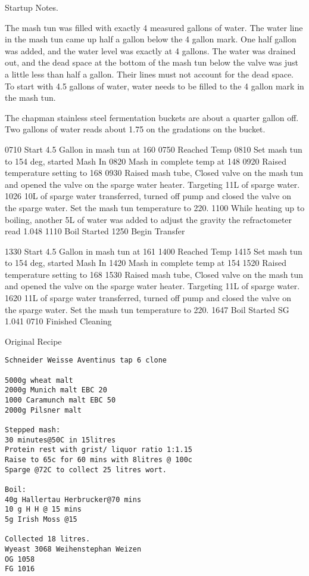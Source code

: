 Startup Notes.
\begin{my_itemize}
  \item The mash tun was filled with exactly 4 measured gallons of water.  The water line in the mash tun came up half a gallon below the 4 gallon mark.  One half gallon was added, and the water level was exactly at 4 gallons.  The water was drained out, and the dead space at the bottom of the mash tun below the valve was just a little less than half a gallon.  Their lines must not account for the dead space.  To start with 4.5 gallons of water, water needs to be filled to the 4 gallon mark in the mash tun.
  \item The chapman stainless steel fermentation buckets are about a quarter gallon off.  Two gallons of water reads about 1.75 on the gradations on the bucket.
\end{my_itemize}
0710 Start 4.5 Gallon in mash tun at 160
0750 Reached Temp
0810 Set mash tun to 154 deg, started Mash In
0820 Mash in complete temp at 148
0920 Raised temperature setting to 168
0930 Raised mash tube, Closed valve on the mash tun and opened the valve on the sparge water heater.  Targeting 11L of sparge water.
1026 10L of sparge water transferred, turned off pump and closed the valve on the sparge water.  Set the mash tun temperature to 220.
1100 While heating up to boiling, another 5L of water was added to adjust the gravity the refractometer read 1.048 
1110 Boil Started
1250 Begin Transfer

1330 Start 4.5 Gallon in mash tun at 161
1400 Reached Temp
1415 Set mash tun to 154 deg, started Mash In
1420 Mash in complete temp at 154
1520 Raised temperature setting to 168
1530 Raised mash tube, Closed valve on the mash tun and opened the valve on the sparge water heater.  Targeting 11L of sparge water.
1620 11L of sparge water transferred, turned off pump and closed the valve on the sparge water.  Set the mash tun temperature to 220.
1647 Boil Started SG 1.041
0710 Finished Cleaning

\def\todaysdate{20190706}
\newday{\todaysdate}\label{\todaysdate}


Original Recipe

\begin{verbatim}
Schneider Weisse Aventinus tap 6 clone

5000g wheat malt
2000g Munich malt EBC 20
1000 Caramunch malt EBC 50
2000g Pilsner malt

Stepped mash:
30 minutes@50C in 15litres
Protein rest with grist/ liquor ratio 1:1.15
Raise to 65c for 60 mins with 8litres @ 100c
Sparge @72C to collect 25 litres wort.

Boil:
40g Hallertau Herbrucker@70 mins
10 g H H @ 15 mins
5g Irish Moss @15

Collected 18 litres.
Wyeast 3068 Weihenstephan Weizen
OG 1058
FG 1016
\end{verbatim}

